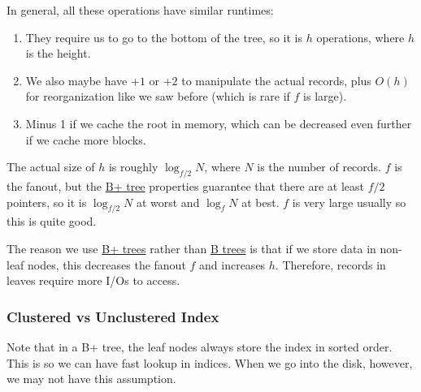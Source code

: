     \begin{theorem}
      \label{thm:io-cost-of-lookup-insertion-deletion}
      In general, all these operations have similar runtimes: 
      \begin{enumerate}
        \item They require us to go to the bottom of the tree, so it is $h$ operations, where $h$ is the height. 
        \item We also maybe have $+1$ or $+2$ to manipulate the actual records, plus $O(h)$ for reorganization like we saw before (which is rare if $f$ is large). 
        \item Minus 1 if we cache the root in memory, which can be decreased even further if we cache more blocks. 
      \end{enumerate}
      
      The actual size of $h$ is roughly $\log_{f/2} {N}$, where $N$ is the number of records. $f$ is the fanout, but the \hyperref[def:b-tree-2]{B+ tree} properties guarantee that there are at least $f/2$ pointers, so it is $\log_{f/2} N$ at worst and $\log_{f} N$ at best. $f$ is very large usually so this is quite good. 
    \end{theorem}
    
    The reason we use \hyperref[def:b-tree-2]{B+ trees} rather than \hyperref[def:b-tree]{B trees} is that if we store data in non-leaf nodes, this decreases the fanout $f$ and increases $h$. Therefore, records in leaves require more I/Os to access. 

  \subsubsection{Clustered vs Unclustered Index} 

    Note that in a B+ tree, the leaf nodes always store the index in sorted order. This is so we can have fast lookup in indices. When we go into the disk, however, we may not have this assumption.  

